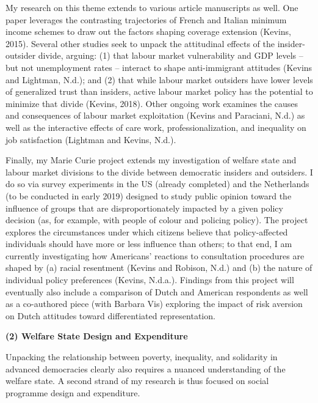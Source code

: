 \documentclass[letterpaper]{scrartcl}
\begin{document}
  My research on this theme extends to various article manuscripts as well. One paper leverages the contrasting trajectories of French and Italian minimum income schemes to draw out the factors shaping coverage extension (Kevins, 2015). Several other studies seek to unpack the attitudinal effects of the insider-outsider divide, arguing: (1) that labour market vulnerability and GDP levels -- but not unemployment rates -- interact to shape anti-immigrant attitudes (Kevins and Lightman, N.d.); and (2) that while labour market outsiders have lower levels of generalized trust than insiders, active labour market policy has the potential to minimize that divide (Kevins, 2018). Other ongoing work examines the causes and consequences of labour market exploitation (Kevins and Paraciani, N.d.) as well as the interactive effects of care work, professionalization, and inequality on job satisfaction (Lightman and Kevins, N.d.).

  Finally, my Marie Curie project extends my investigation of welfare state and labour market divisions to the divide between democratic insiders and outsiders. I do so via survey experiments in the US (already completed) and the Netherlands (to be conducted in early 2019) designed to study public opinion toward the influence of groups that are disproportionately impacted by a given policy decision (as, for example, with people of colour and policing policy). The project explores the circumstances under which citizens believe that policy-affected individuals should have more or less influence than others; to that end, I am currently investigating how Americans' reactions to consultation procedures are shaped by (a) racial resentment (Kevins and Robison, N.d.) and (b) the nature of individual policy preferences (Kevins, N.d.a.). Findings from this project will eventually also include a comparison of Dutch and American respondents as well as a co-authored piece (with Barbara Vis) exploring the impact of risk aversion on Dutch attitudes toward differentiated representation.

  \textbf{(2) Welfare State Design and Expenditure}
  \vspace{-1em}

  Unpacking the relationship between poverty, inequality, and solidarity in advanced democracies clearly also requires a nuanced understanding of the welfare state. A second strand of my research is thus focused on social programme design and expenditure.
\end{document}
